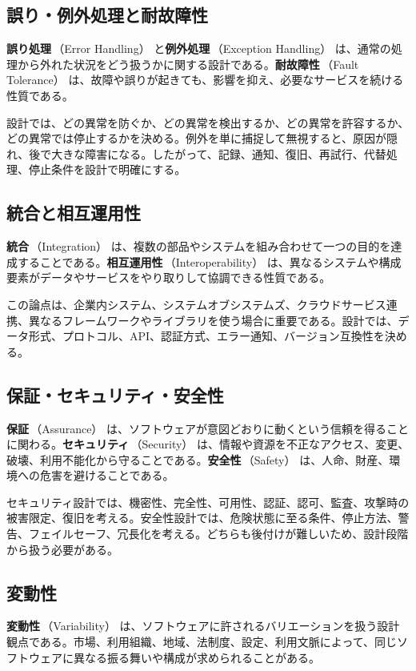 \documentclass[10.5pt,a4paper]{ltjsarticle}
\newcommand{\term}[2]{\textbf{#1}\,（#2）}
\begin{document}
\subsection{誤り・例外処理と耐故障性}

\term{誤り処理}{Error Handling} と\term{例外処理}{Exception Handling} は、通常の処理から外れた状況をどう扱うかに関する設計である。\term{耐故障性}{Fault Tolerance} は、故障や誤りが起きても、影響を抑え、必要なサービスを続ける性質である。

設計では、どの異常を防ぐか、どの異常を検出するか、どの異常を許容するか、どの異常では停止するかを決める。例外を単に捕捉して無視すると、原因が隠れ、後で大きな障害になる。したがって、記録、通知、復旧、再試行、代替処理、停止条件を設計で明確にする。

\subsection{統合と相互運用性}

\term{統合}{Integration} は、複数の部品やシステムを組み合わせて一つの目的を達成することである。\term{相互運用性}{Interoperability} は、異なるシステムや構成要素がデータやサービスをやり取りして協調できる性質である。

この論点は、企業内システム、システムオブシステムズ、クラウドサービス連携、異なるフレームワークやライブラリを使う場合に重要である。設計では、データ形式、プロトコル、API、認証方式、エラー通知、バージョン互換性を決める。

\subsection{保証・セキュリティ・安全性}

\term{保証}{Assurance} は、ソフトウェアが意図どおりに動くという信頼を得ることに関わる。\term{セキュリティ}{Security} は、情報や資源を不正なアクセス、変更、破壊、利用不能化から守ることである。\term{安全性}{Safety} は、人命、財産、環境への危害を避けることである。

セキュリティ設計では、機密性、完全性、可用性、認証、認可、監査、攻撃時の被害限定、復旧を考える。安全性設計では、危険状態に至る条件、停止方法、警告、フェイルセーフ、冗長化を考える。どちらも後付けが難しいため、設計段階から扱う必要がある。

\subsection{変動性}

\term{変動性}{Variability} は、ソフトウェアに許されるバリエーションを扱う設計観点である。市場、利用組織、地域、法制度、設定、利用文脈によって、同じソフトウェアに異なる振る舞いや構成が求められることがある。
\end{document}
